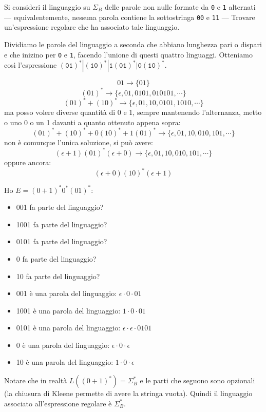 \begin{example}\label{exa:01}
Si consideri il linguaggio su $\Sigma_{B}$ delle parole non nulle formate da  \texttt{0} e \texttt{1} alternati --- equivalentemente, nessuna
parola contiene la sottostringa  \texttt{00} e \texttt{11} ---
Trovare un'espressione regolare che ha associato tale linguaggio.

Dividiamo le parole del linguaggio a seconda che abbiano lunghezza pari o dispari e che inizino per \texttt{0} e
\texttt{1}, facendo l'unione di questi quattro linguaggi.
Otteniamo così l'espressione $(\mathtt{01})^* | (\mathtt{10})^* | \mathtt{1}(\mathtt{01})^* | \mathtt{0}(\mathtt{10})^*$.

		\[01\to \{01\}\]
		$$(01)^*\to \{\epsilon, 01, 0101,010101,\cdots\}$$
		$$(01)^{*} + (10)^{*} \to \{ \epsilon, 01,10,0101,1010, \cdots \} $$
		ma posso volere diverse quantità di 0 e 1, sempre mantenendo l'alternanza, metto o uno 0 o un 1 davanti a quanto ottenuto appena sopra:
		$$(01)^*+(10)^*+0(10)^*+1(01)^*\to \{\epsilon,01,10,010,101,\cdots\}$$
		non è comunque l'unica soluzione, si può avere:
		$$(\epsilon+1)(01)^*(\epsilon+0)\to \{\epsilon,01,10,010,101,\cdots\}$$
		oppure ancora:
		$$(\epsilon+0)(10)^*(\epsilon+1)$$
\end{example}


\begin{Exercise}[label=3-1]
Ho $E=(0+1)^*0^*(01)^*$:
\begin{itemize}
\item 001 fa parte del linguaggio?
\item 1001 fa parte del linguaggio?
\item 0101 fa parte del linguaggio?
\item 0 fa parte del linguaggio?
\item 10 fa parte del linguaggio?
\end{itemize}
\end{Exercise}


\begin{Answer}
\begin{itemize}
\item 001 è una parola del linguaggio: $\epsilon\cdot 0\cdot 01$
\item 1001 è una parola del linguaggio: $1\cdot 0\cdot 01$
\item 0101 è una parola del linguaggio: $\epsilon\cdot\epsilon \cdot 0101$
\item 0 è una parola del linguaggio: $\epsilon\cdot 0\cdot \epsilon$
\item 10 è una parola del linguaggio: $1\cdot 0\cdot \epsilon$
\end{itemize}

Notare che in realtà $L((0+1)^*)= \Sigma_{B}^*$ e le parti che seguono sono opzionali (la chiusura di Kleene permette di
avere la stringa vuota).
Quindi il linguaggio associato all'espressione regolare è $\Sigma_{B}^*$.
\end{Answer}

